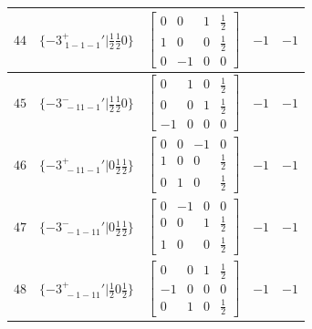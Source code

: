 \documentclass[fleqn,8pt]{jsarticle}
\begin{document}
\begin{longtable}{ccccc}
$ 44 $ & $ \{-3^{+}_{\,\,1-1-1}{}'|\frac{1}{2} \frac{1}{2} 0\} $ & $ \begin{bmatrix} 0 & 0 & 1 & \frac{1}{2} \\ 1 & 0 & 0 & \frac{1}{2} \\ 0 & -1 & 0 & 0 \end{bmatrix} $ & $ -1 $ & $ -1 $ \\ \hline
$ 45 $ & $ \{-3^{-}_{\,\,-11-1}{}'|\frac{1}{2} \frac{1}{2} 0\} $ & $ \begin{bmatrix} 0 & 1 & 0 & \frac{1}{2} \\ 0 & 0 & 1 & \frac{1}{2} \\ -1 & 0 & 0 & 0 \end{bmatrix} $ & $ -1 $ & $ -1 $ \\ \hline
$ 46 $ & $ \{-3^{+}_{\,\,-11-1}{}'|0 \frac{1}{2} \frac{1}{2}\} $ & $ \begin{bmatrix} 0 & 0 & -1 & 0 \\ 1 & 0 & 0 & \frac{1}{2} \\ 0 & 1 & 0 & \frac{1}{2} \end{bmatrix} $ & $ -1 $ & $ -1 $ \\ \hline
$ 47 $ & $ \{-3^{-}_{\,\,-1-11}{}'|0 \frac{1}{2} \frac{1}{2}\} $ & $ \begin{bmatrix} 0 & -1 & 0 & 0 \\ 0 & 0 & 1 & \frac{1}{2} \\ 1 & 0 & 0 & \frac{1}{2} \end{bmatrix} $ & $ -1 $ & $ -1 $ \\ \hline
$ 48 $ & $ \{-3^{+}_{\,\,-1-11}{}'|\frac{1}{2} 0 \frac{1}{2}\} $ & $ \begin{bmatrix} 0 & 0 & 1 & \frac{1}{2} \\ -1 & 0 & 0 & 0 \\ 0 & 1 & 0 & \frac{1}{2} \end{bmatrix} $ & $ -1 $ & $ -1 $ \\
\end{longtable}
\end{document}
